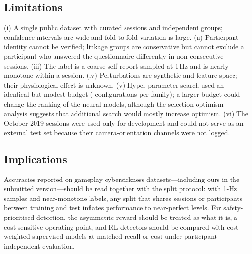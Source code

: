 \subsection{Limitations}
(i) A single public dataset with \nSessionsEval{} curated sessions and \nGroupsEval{} independent groups; confidence intervals are wide and fold-to-fold variation is large. (ii) Participant identity cannot be verified; linkage groups are conservative but cannot exclude a participant who answered the questionnaire differently in non-consecutive sessions. (iii) The label is a coarse self-report sampled at 1\,Hz and is nearly monotone within a session. (iv) Perturbations are synthetic and feature-space; their physiological effect is unknown. (v) Hyper-parameter search used an identical but modest budget (\HPOBudget{} configurations per family); a larger budget could change the ranking of the neural models, although the selection-optimism analysis suggests that additional search would mostly increase optimism. (vi) The October-2019 sessions were used only for development and could not serve as an external test set because their camera-orientation channels were not logged.

\subsection{Implications}
Accuracies reported on gameplay cybersickness datasets---including ours in the submitted version---should be read together with the split protocol: with 1-Hz samples and near-monotone labels, any split that shares sessions or participants between training and test inflates performance to near-perfect levels. For safety-prioritised detection, the asymmetric reward should be treated as what it is, a cost-sensitive operating point, and RL detectors should be compared with cost-weighted supervised models at matched recall or cost under participant-independent evaluation.
